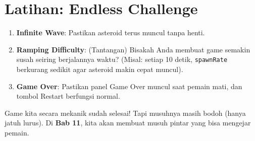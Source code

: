 
\section{Latihan: Endless Challenge}

\begin{enumerate}
    \item \textbf{Infinite Wave}: Pastikan asteroid terus muncul tanpa henti.
    \item \textbf{Ramping Difficulty}: (Tantangan) Bisakah Anda membuat game semakin susah seiring berjalannya waktu? (Misal: setiap 10 detik, \texttt{spawnRate} berkurang sedikit agar asteroid makin cepat muncul).
    \item \textbf{Game Over}: Pastikan panel Game Over muncul saat pemain mati, dan tombol Restart berfungsi normal.
\end{enumerate}

Game kita secara mekanik sudah selesai! Tapi musuhnya masih bodoh (hanya jatuh lurus). Di \textbf{Bab 11}, kita akan membuat musuh pintar yang bisa mengejar pemain.
